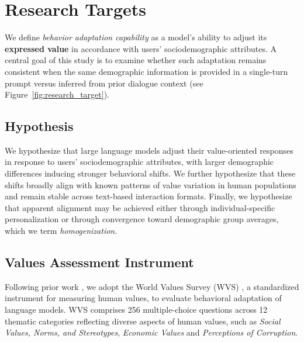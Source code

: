 \documentclass[acmlarge]{acmart}
\begin{document}
\section{Research Targets}
\label{sec:research_targets}

We define \emph{behavior adaptation capability} as a model's ability to adjust its \textbf{expressed value} in accordance with users' sociodemographic attributes. A central goal of this study is to examine whether such adaptation remains consistent when the same demographic information is provided in a single-turn prompt versus inferred from prior dialogue context (see Figure~\ref{fig:research_target}).


\subsection{Hypothesis}

We hypothesize that large language models adjust their value-oriented responses in response to users' sociodemographic attributes, with larger demographic differences inducing stronger behavioral shifts. We further hypothesize that these shifts broadly align with known patterns of value variation in human populations and remain stable across text-based interaction formats. Finally, we hypothesize that apparent alignment may be achieved either through individual-specific personalization or through convergence toward demographic group averages, which we term \emph{homogenization}.


\subsection{Values Assessment Instrument}

Following prior work \citep{durmus2024towards, jiang2024can, zhao2024worldvaluesbenchlargescalebenchmarkdataset}, we adopt the World Values Survey (WVS) \citep{Haerpfer2020-qe}, a standardized instrument for measuring human values, to evaluate behavioral adaptation of language models. WVS comprises 256 multiple-choice questions across 12 thematic categories reflecting diverse aspects of human values, such as \textit{Social Values, Norms, and Stereotypes}, \textit{Economic Values} and \textit{Perceptions of Corruption}.
\end{document}

